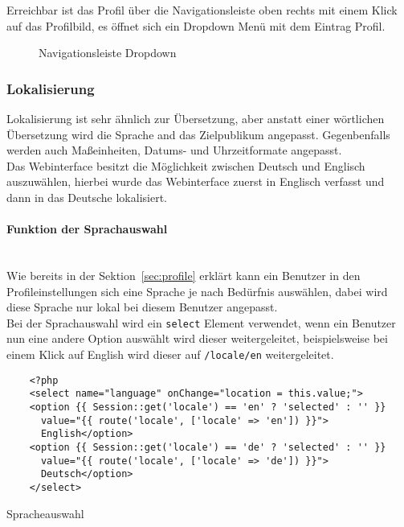 Erreichbar ist das Profil über die Navigationsleiste oben rechts mit einem Klick
auf das Profilbild, es öffnet sich ein Dropdown Menü mit dem Eintrag Profil. 

\begin{figure}[H]
  \centering
  \caption{Navigationsleiste Dropdown}
\end{figure}

\subsubsection{Lokalisierung}
Lokalisierung ist sehr ähnlich zur Übersetzung, aber anstatt einer wörtlichen
Übersetzung wird die Sprache and das Zielpublikum angepasst. Gegenbenfalls
werden auch Maßeinheiten, Datums- und Uhrzeitformate angepasst.\\

Das Webinterface besitzt die Möglichkeit zwischen Deutsch und Englisch
auszuwählen, hierbei wurde das Webinterface zuerst in Englisch verfasst und dann
in das Deutsche lokalisiert.

\paragraph{Funktion der Sprachauswahl}\mbox{}\\
Wie bereits in der Sektion~\ref{sec:profile} erklärt kann ein Benutzer in den
Profileinstellungen sich eine Sprache je nach Bedürfnis auswählen, dabei wird
diese Sprache nur lokal bei diesem Benutzer angepasst.\\

Bei der Sprachauswahl wird ein \verb|select| Element verwendet, wenn ein
Benutzer nun eine andere Option auswählt wird dieser weitergeleitet,
beispielsweise bei einem Klick auf English wird dieser auf \verb|/locale/en|
weitergeleitet. 

\begin{listing}[H]
  \begin{verbatim}
    <?php
    <select name="language" onChange="location = this.value;">
    <option {{ Session::get('locale') == 'en' ? 'selected' : '' }}
      value="{{ route('locale', ['locale' => 'en']) }}">
      English</option>
    <option {{ Session::get('locale') == 'de' ? 'selected' : '' }}
      value="{{ route('locale', ['locale' => 'de']) }}">
      Deutsch</option>
    </select>
  \end{verbatim}
  \caption{Spracheauswahl}
\end{listing}

